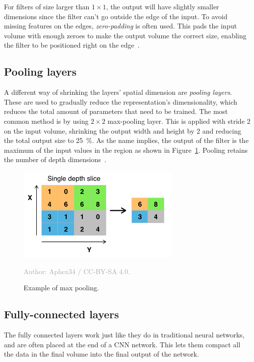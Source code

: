 \documentclass{kththesis}
\newcommand{\source}[1]{\vspace{-5mm}\caption*{\textcolor{darkgray}{Author: {#1}}\vspace{-7mm}} }
\begin{document}
For filters of size larger than $1 \times 1$, the output will have slightly smaller dimensions since the filter can't go outside the edge of the input. To avoid missing features on the edges, \textit{zero-padding} is often used. This pads the input volume with enough zeroes to make the output volume the correct size, enabling the filter to be positioned right on the edge~\cite{cnnIntro}.

\subsection{Pooling layers}
A different way of shrinking the layers' spatial dimension are \textit{pooling layers}. These are used to gradually reduce the representation's dimensionality, which reduces the total amount of parameters that need to be trained. The most common method is by using $2\times 2$ max-pooling layer. This is applied with stride 2 on the input volume, shrinking the output width and height by 2 and reducing the total output size to 25~\%. As the name implies, the output of the filter is the maximum of the input values in the region as shown in Figure~\ref{fig:max_pooling}. Pooling retains the number of depth dimensions~\cite{cnnIntro}.

\begin{figure}
  \begin{center}
    \includegraphics[width=80mm]{img/max_pooling.png}
    \caption{Example of max pooling.}
    \source{Aphex34 / CC-BY-SA 4.0.}
    \label{fig:max_pooling}
  \end{center}
\end{figure}

\subsection{Fully-connected layers}
The fully connected layers work just like they do in traditional neural networks, and are often placed at the end of a CNN network. This lets them compact all the data in the final volume into the final output of the network.
\end{document}
